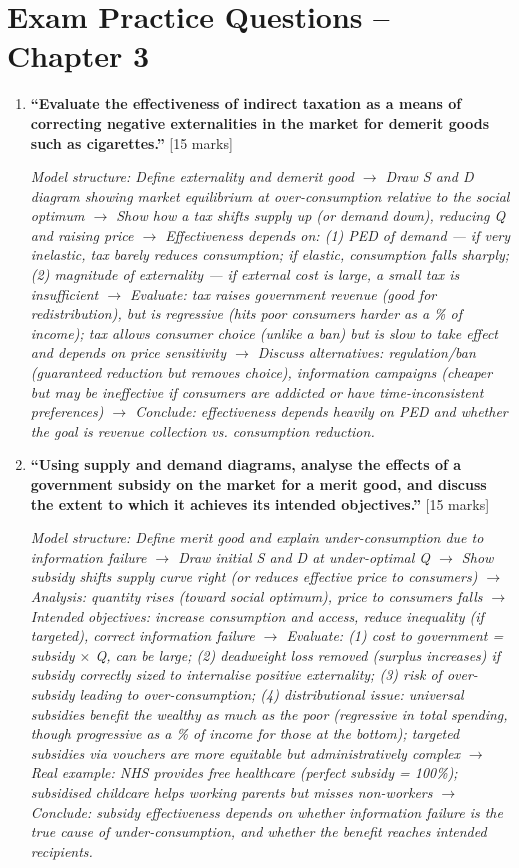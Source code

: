 \documentclass[11pt, a4paper, twoside]{book}
\begin{document}
\section{Exam Practice Questions -- Chapter 3}

\begin{exampractice}
\begin{enumerate}[leftmargin=*]

\item \textbf{``Evaluate the effectiveness of indirect taxation as a means of correcting negative externalities in the market for demerit goods such as cigarettes.''} [15 marks]

\textit{Model structure: Define externality and demerit good $\to$ Draw S and D diagram showing market equilibrium at over-consumption relative to the social optimum $\to$ Show how a tax shifts supply up (or demand down), reducing Q and raising price $\to$ Effectiveness depends on: (1) PED of demand — if very inelastic, tax barely reduces consumption; if elastic, consumption falls sharply; (2) magnitude of externality — if external cost is large, a small tax is insufficient $\to$ Evaluate: tax raises government revenue (good for redistribution), but is regressive (hits poor consumers harder as a \% of income); tax allows consumer choice (unlike a ban) but is slow to take effect and depends on price sensitivity $\to$ Discuss alternatives: regulation/ban (guaranteed reduction but removes choice), information campaigns (cheaper but may be ineffective if consumers are addicted or have time-inconsistent preferences) $\to$ Conclude: effectiveness depends heavily on PED and whether the goal is revenue collection vs. consumption reduction.}

\item \textbf{``Using supply and demand diagrams, analyse the effects of a government subsidy on the market for a merit good, and discuss the extent to which it achieves its intended objectives.''} [15 marks]

\textit{Model structure: Define merit good and explain under-consumption due to information failure $\to$ Draw initial S and D at under-optimal Q $\to$ Show subsidy shifts supply curve right (or reduces effective price to consumers) $\to$ Analysis: quantity rises (toward social optimum), price to consumers falls $\to$ Intended objectives: increase consumption and access, reduce inequality (if targeted), correct information failure $\to$ Evaluate: (1) cost to government = subsidy $\times$ Q, can be large; (2) deadweight loss removed (surplus increases) if subsidy correctly sized to internalise positive externality; (3) risk of over-subsidy leading to over-consumption; (4) distributional issue: universal subsidies benefit the wealthy as much as the poor (regressive in total spending, though progressive as a \% of income for those at the bottom); targeted subsidies via vouchers are more equitable but administratively complex $\to$ Real example: NHS provides free healthcare (perfect subsidy = 100\%); subsidised childcare helps working parents but misses non-workers $\to$ Conclude: subsidy effectiveness depends on whether information failure is the true cause of under-consumption, and whether the benefit reaches intended recipients.}


\end{enumerate}
\end{exampractice}
\end{document}
